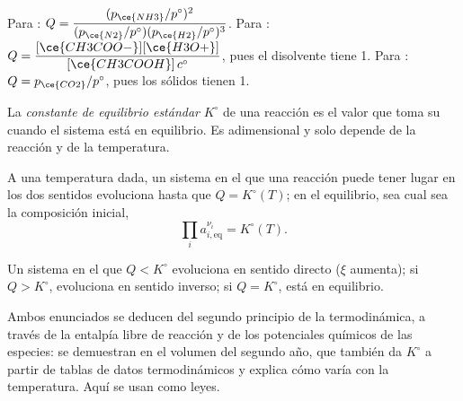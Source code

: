 \begin{example}\label{ex:b1:extent-q-and-k:quotients}
Para : $Q = \dfrac{(p_{\ce{NH3}}/p^\circ)^2}
{(p_{\ce{N2}}/p^\circ)(p_{\ce{H2}}/p^\circ)^3}$. Para
: $Q =
\dfrac{[\ce{CH3COO-}][\ce{H3O+}]}{[\ce{CH3COOH}]\,c^\circ}$, pues el
disolvente tiene  1. Para : $Q =
p_{\ce{CO2}}/p^\circ$, pues los sólidos tienen  1.
\end{example}

\begin{definition}\label{def:b1:extent-q-and-k:equilibrium-constant}
La \emph{constante de equilibrio estándar}
$K^\circ$ de una reacción es el valor que toma su 
cuando el sistema está en equilibrio. Es adimensional y solo depende de
la reacción y de la temperatura.
\end{definition}

\begin{theorem}\label{thm:b1:extent-q-and-k:mass-action}
A una temperatura dada, un sistema en el que una reacción puede tener
lugar en los dos sentidos evoluciona hasta que $Q = K^\circ(T)$; en el
equilibrio, sea cual sea la composición inicial,
\[
  \prod_i a_{i,\text{eq}}^{\nu_i} = K^\circ(T) .
\]
\end{theorem}
\admitted

\begin{proposition}\label{prop:b1:extent-q-and-k:direction}
Un sistema en el que $Q < K^\circ$ evoluciona en sentido directo ($\xi$
aumenta); si $Q > K^\circ$, evoluciona en sentido inverso; si
$Q = K^\circ$, está en equilibrio.
\end{proposition}
\admitted

\begin{remark}\label{rem:b1:extent-q-and-k:origin}
Ambos enunciados se deducen del segundo principio de la termodinámica, a
través de la entalpía libre de reacción y de los potenciales químicos de
las especies: se demuestran en el volumen del segundo año, que también da
$K^\circ$ a partir de tablas de datos termodinámicos y explica cómo
varía con la temperatura. Aquí se usan como leyes.
\end{remark}

